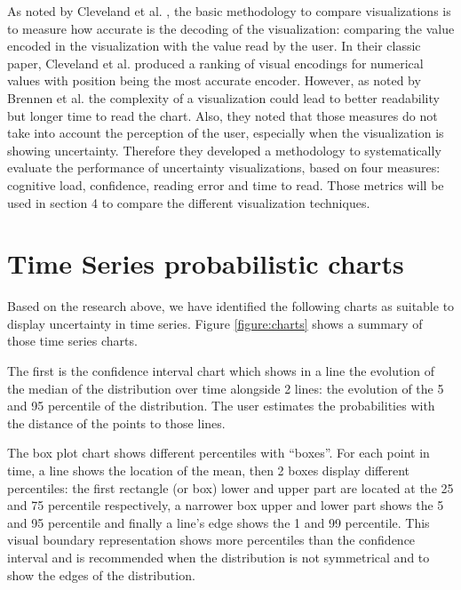\documentclass[a4paper,3p,sort&compress]{elsarticle}
\begin{document}
As noted by Cleveland et al. \cite{cleveland_graphical_1984}, the basic methodology to compare visualizations is to measure how accurate is the 
decoding of the visualization: comparing the value encoded in the visualization with the value read
by the user. In their classic paper, Cleveland et al. \cite{cleveland_graphical_1984} produced a ranking of visual encodings for numerical values 
with position being the most accurate encoder. However, as noted by Brennen et al. \cite{brennen_instrument_2018}
the complexity of a visualization could lead to better readability but longer time to read the chart. Also, 
they noted that those measures do not take into account the perception of the user, especially when the visualization
is showing uncertainty. Therefore they developed a methodology 
to systematically evaluate the performance of uncertainty visualizations, based on four measures: 
cognitive load, confidence, reading error and time to read. Those metrics will be used in section 4 to compare the different 
visualization techniques.

\section{Time Series probabilistic charts}  
\label{sec:time_series}

Based on the research above, we have identified the following charts as suitable to display 
uncertainty in time series. Figure \ref{figure:charts} shows a summary of those time series charts.

The first is the confidence interval chart  which shows in a line the evolution of the 
median of the distribution
 over time alongside 2 lines: the evolution of the 5 and 95 percentile of the distribution. 
 The user estimates the probabilities with the distance of the points to those lines.

The box plot chart shows different percentiles with “boxes”. For each point in time, a 
line shows the location of the mean, then 2 boxes display different percentiles: the
first rectangle (or box) lower and upper part are located 
at the 25 and 75 percentile respectively, a narrower box upper and lower part shows 
the 5 and 95 percentile and finally a line’s edge shows the 1 and 99 percentile. 
This visual boundary representation shows more percentiles than the confidence interval and 
is recommended when the distribution is not symmetrical and to show the edges of the distribution.
\end{document}
